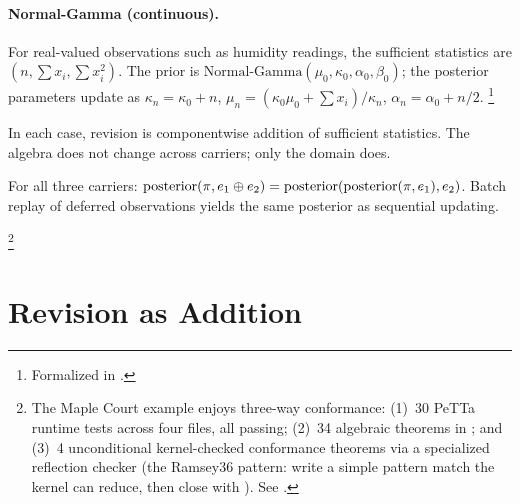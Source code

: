 \documentclass[11pt,openany]{report}
\begin{document}
\paragraph{Normal-Gamma (continuous).}
For real-valued observations such as humidity readings, the sufficient
statistics are $(n, \sum x_i, \sum x_i^2)$.  The prior is
$\text{Normal-Gamma}(\mu_0, \kappa_0, \alpha_0, \beta_0)$; the
posterior parameters update as
$\kappa_n = \kappa_0 + n$,
$\mu_n = (\kappa_0 \mu_0 + \sum x_i) / \kappa_n$,
$\alpha_n = \alpha_0 + n/2$.%
\footnote{Formalized in .}

\medskip\noindent
In each case, revision is componentwise addition of sufficient
statistics.  The algebra does not change across carriers; only the
domain does.

\begin{theorem}
\label{thm:sleep-consolidation}
For all three carriers:
$\mathrm{posterior}(\pi, e_1 \oplus e_2)
= \mathrm{posterior}(\mathrm{posterior}(\pi, e_1), e_2)$.
Batch replay of deferred observations yields the same posterior as
sequential updating.
\end{theorem}

%
\footnote{The Maple Court example enjoys three-way conformance:
(1)~30 PeTTa runtime tests across four  files, all
passing; (2)~34 algebraic theorems in
; and
(3)~4 unconditional kernel-checked conformance theorems via a
specialized reflection checker (the Ramsey36 pattern: write a
simple pattern match the kernel can reduce, then close with
).  See
.}


\section{Revision as Addition}
\end{document}
